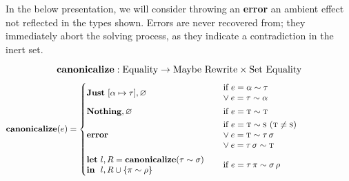 \documentclass[10pt, letterpaper, oneside]{article}
\newcommand{\error}{\text{\bf error}}
\begin{document}
In the below presentation, we will consider throwing an {\bf error} an ambient effect not reflected in the types shown. Errors are never recovered from; they immediately abort the solving process, as they indicate a contradiction in the inert set.

\begin{equation*}
  \text{\bf canonicalize} : \text{Equality} \to \text{Maybe}~\text{Rewrite} \times \text{Set}~\text{Equality}
\end{equation*}
\begin{equation*}
  \text{\bf canonicalize}(e) =
  \begin{cases}
    \text{\bf Just}~[\alpha \mapsto \tau], \varnothing &
    \begin{minipage}[h]{13em}
      \vspace{.35em}
      \(
      \text{if } e = \alpha \sim \tau\\
      \lor e = \tau \sim \alpha
      \)\\
      \vspace{-.6em}
    \end{minipage}\\
    \text{\bf Nothing}, \varnothing & \text{if } e = \text{\sc t} \sim \text{\sc t}\\
    \error &
    \begin{minipage}[h]{15em}
      \vspace{.35em}
      \(
      \text{if } e = \text{\sc t} \sim \text{\sc s}\ (\text{\sc t} \ne \text{\sc s})\\
            \lor e = \text{\sc t} \sim \tau\, \sigma\\
            \lor e = \tau\, \sigma \sim \text{\sc t}
      \)\\
      \vspace{-.6em}
    \end{minipage}\\
    \begin{minipage}[h]{15em}
      \vspace{.35em}
      \(
      \text{\bf let}~l, R = \text{\bf canonicalize}(\tau \sim \sigma)\\
      \text{\bf in}~~l, R \cup \{\pi \sim \rho\}
      \)\\
      \vspace{-.6em}
    \end{minipage}
    & \text{if } e = \tau\, \pi \sim \sigma\, \rho\\
  \end{cases}
\end{equation*}
\end{document}
